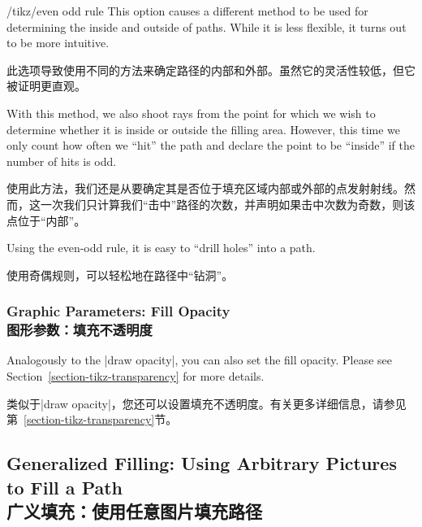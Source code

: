 \begin{key}{/tikz/even odd rule}
    This option causes a different method to be used for determining the inside
    and outside of paths. While it is less flexible, it turns out to be more
    intuitive.

    此选项导致使用不同的方法来确定路径的内部和外部。虽然它的灵活性较低，但它被证明更直观。

    With this method, we also shoot rays from the point for which we wish to
    determine whether it is inside or outside the filling area. However, this
    time we only count how often we ``hit'' the path and declare the point to
    be ``inside'' if the number of hits is odd.

    使用此方法，我们还是从要确定其是否位于填充区域内部或外部的点发射射线。然而，这一次我们只计算我们“击中”路径的次数，并声明如果击中次数为奇数，则该点位于“内部”。

    Using the even-odd rule, it is easy to ``drill holes'' into a path.

    使用奇偶规则，可以轻松地在路径中“钻洞”。

\begin{codeexample}[]
\end{codeexample}
\end{key}


\subsubsection{Graphic Parameters: Fill Opacity\\图形参数：填充不透明度}
\label{section-fill-opacity}

Analogously to the |draw opacity|, you can also set the fill opacity. Please
see Section~\ref{section-tikz-transparency} for more details.

类似于|draw opacity|，您还可以设置填充不透明度。有关更多详细信息，请参见第~\ref{section-tikz-transparency}节。


\subsection{Generalized Filling: Using Arbitrary Pictures to Fill a Path\\广义填充：使用任意图片填充路径}

